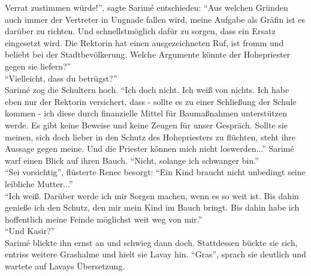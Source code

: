 Verrat zustimmen würde!'', sagte Sarimé entschieden: ``Aus welchen Gründen auch immer der Vertreter 
in Ungnade fallen wird, meine Aufgabe als Gräfin ist es darüber zu richten. Und schnellstmöglich 
dafür zu sorgen, dass ein Ersatz eingesetzt wird. Die Rektorin hat einen ausgezeichneten Ruf, ist 
fromm und beliebt bei der Stadtbevölkerung. Welche Argumente könnte der Hohepriester gegen sie 
liefern?''\\
``Vielleicht, dass du betrügst?''\\
Sarimé zog die Schultern hoch. ``Ich doch nicht. Ich weiß von nichts. Ich habe eben nur der 
Rektorin versichert, dass - sollte es zu einer Schließung der Schule kommen - ich diese durch 
finanzielle Mittel für Baumaßnahmen unterstützen werde. Es gibt keine Beweise und keine Zeugen für 
unser Gespräch. Sollte sie meinen, sich doch lieber in den Schutz des Hohepriesters zu flüchten, 
steht ihre Aussage gegen meine. Und die Priester können mich nicht loswerden...'' Sarimé warf einen 
Blick auf ihren Bauch. ``Nicht, solange ich schwanger bin.''\\
``Sei vorsichtig'', flüsterte Renec besorgt: ``Ein Kind braucht nicht unbedingt seine leibliche 
Mutter...''\\
``Ich weiß. Darüber werde ich mir Sorgen machen, wenn es so weit ist. Bis dahin genieße ich den 
Schutz, den mir mein Kind im Bauch bringt. Bis dahin habe ich hoffentlich meine Feinde möglichst 
weit weg von mir.''\\
``Und Kasir?''\\
Sarimé blickte ihn ernst an und schwieg dann doch. Stattdessen bückte sie sich, entriss weitere 
Grashalme und hielt sie Lavay hin. ``Gras'', sprach sie deutlich und wartete auf Lavays Übersetzung.

